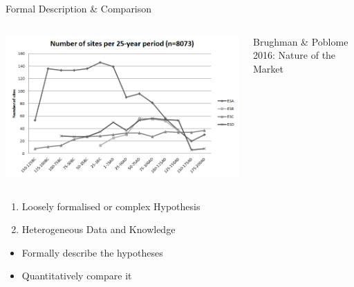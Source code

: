 \documentclass[12pt, notes=show]{beamer}
\begin{document}
\begin{frame}{Formal Description \& Comparison}
    \begin{columns}
	\begin{column}{.6\textwidth}
	    \begin{center}
		\includegraphics[width=\textwidth]{images/wareRome.png} 
	    \end{center}
	\end{column}
	\begin{column}{.45\textwidth}
	\small Brughman \& Poblome 2016: Nature of the Market
	\end{column}
    \end{columns}
	\begin{enumerate}
	    \item<2-> Loosely formalised or complex Hypothesis
	    \item<3-> Heterogeneous Data and Knowledge
	\end{enumerate}

	\begin{itemize}
	    \item<5-> Formally describe the hypotheses
	    \item<6-> Quantitatively compare it
	\end{itemize}

\end{frame}
\end{document}
